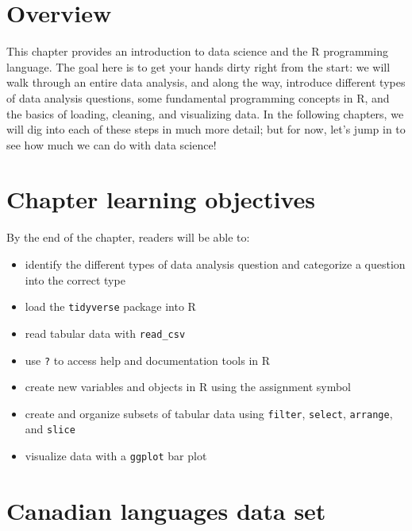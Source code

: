 \documentclass[
  12pt,
]{krantz}
\providecommand{\tightlist}{%
  \setlength{\itemsep}{0pt}\setlength{\parskip}{0pt}}
\begin{document}
\hypertarget{overview}{%
\section{Overview}\label{overview}}

This chapter provides an introduction to data science and the R programming language.
The goal here is to get your hands dirty right from the start: we will walk through an entire data analysis,
and along the way, introduce different types of data analysis questions, some fundamental programming
concepts in R, and the basics of loading, cleaning, and visualizing data. In the following chapters, we will
dig into each of these steps in much more detail; but for now, let's jump in to see how much we can do
with data science!

\hypertarget{chapter-learning-objectives}{%
\section{Chapter learning objectives}\label{chapter-learning-objectives}}

By the end of the chapter, readers will be able to:

\begin{itemize}
\tightlist
\item
  identify the different types of data analysis question and categorize a question into the correct type
\item
  load the \texttt{tidyverse} package into R
\item
  read tabular data with \texttt{read\_csv}
\item
  use \texttt{?} to access help and documentation tools in R
\item
  create new variables and objects in R using the assignment symbol
\item
  create and organize subsets of tabular data using \texttt{filter}, \texttt{select}, \texttt{arrange}, and \texttt{slice}
\item
  visualize data with a \texttt{ggplot} bar plot
\end{itemize}

\hypertarget{canadian-languages-data-set}{%
\section{Canadian languages data set}\label{canadian-languages-data-set}}
\end{document}
